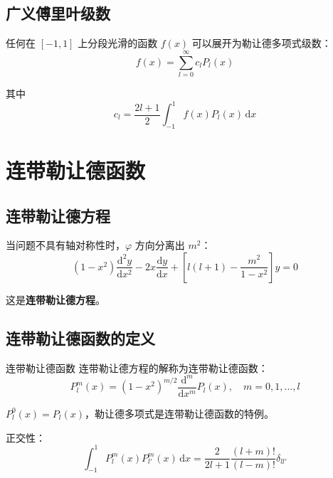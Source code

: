 \subsection{广义傅里叶级数}

任何在 $[-1, 1]$ 上分段光滑的函数 $f(x)$ 可以展开为勒让德多项式级数：
\begin{equation}
    f(x) = \sum_{l=0}^{\infty} c_l P_l(x)
\end{equation}

其中
\begin{equation}
    \boxed{c_l = \frac{2l+1}{2}\int_{-1}^{1} f(x)P_l(x)\,\mathrm{d}x}
\end{equation}

\section{连带勒让德函数}

\subsection{连带勒让德方程}

当问题不具有轴对称性时，$\varphi$ 方向分离出 $m^2$：
\begin{equation}
    (1-x^2)\frac{\mathrm{d}^2 y}{\mathrm{d}x^2} - 2x\frac{\mathrm{d}y}{\mathrm{d}x} + \left[l(l+1) - \frac{m^2}{1-x^2}\right]y = 0
\end{equation}

这是\textbf{连带勒让德方程}。

\subsection{连带勒让德函数的定义}

\begin{dingliyi}{连带勒让德函数}{}
连带勒让德方程的解称为连带勒让德函数：
\begin{equation}
    \boxed{P_l^m(x) = (1-x^2)^{m/2}\frac{\mathrm{d}^m}{\mathrm{d}x^m}P_l(x), \quad m = 0, 1, \ldots, l}
\end{equation}
\end{dingliyi}

\begin{tishi}
$P_l^0(x) = P_l(x)$，勒让德多项式是连带勒让德函数的特例。
\end{tishi}

正交性：
\begin{equation}
    \int_{-1}^{1} P_l^m(x)P_{l'}^m(x)\,\mathrm{d}x = \frac{2}{2l+1}\frac{(l+m)!}{(l-m)!}\delta_{ll'}
\end{equation}

